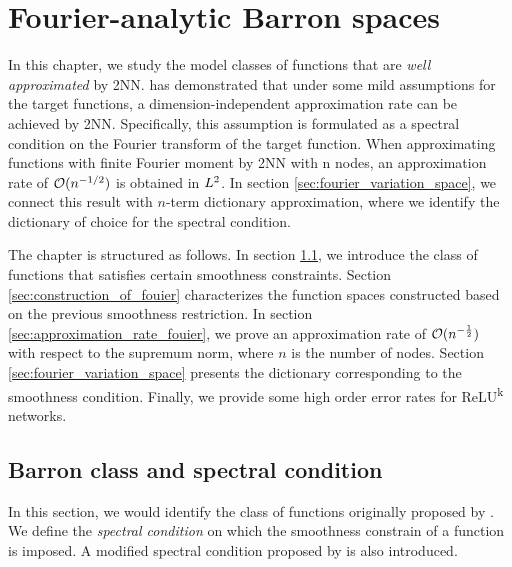 \chapter{Fourier-analytic Barron spaces}
\label{ch:fourier}

In this chapter, we study the model classes of functions that are \textit{well
approximated} by 2NN. \cite{barronUniversalApproximationBounds1993} has
demonstrated that under some mild assumptions for the target functions, a
dimension-independent approximation rate can be achieved by 2NN. Specifically,
this assumption is formulated as a spectral condition on the Fourier transform
of the target function. When approximating functions with finite Fourier moment
by 2NN with n nodes, an approximation rate of $\mathcal{O}(n^{-1/2})$ is obtained in
$L^{2}$. In section \ref{sec:fourier_variation_space}, we connect this result
with $n$-term dictionary approximation, where we identify the dictionary of
choice for the spectral condition.

The chapter is structured as follows. In section \ref{sec:spectral_condition},
we introduce the class of functions that satisfies certain smoothness
constraints. Section \ref{sec:construction_of_fouier} characterizes the function
spaces constructed based on the previous smoothness restriction. In section
\ref{sec:approximation_rate_fouier}, we prove an approximation rate of
$\mathcal{O}(n^{-\frac{1}{2}})$ with respect to the supremum norm, where $n$ is the
number of nodes. Section \ref{sec:fourier_variation_space} presents the
dictionary corresponding to the smoothness condition. Finally, we provide some
high order error rates for ReLU\textsuperscript{k} networks.

\section{Barron class and spectral condition}
\label{sec:spectral_condition}

In this section, we would identify the class of functions originally proposed by
\cite{barronUniversalApproximationBounds1993}. We define the \textit{spectral
condition} on which the smoothness constrain of a function is imposed. A
modified spectral condition proposed by
\cite{siegelCharacterizationVariationSpaces2022} is also introduced.


